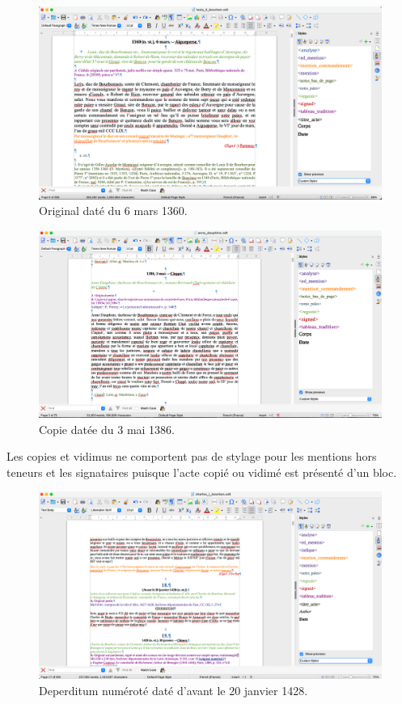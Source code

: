\begin{figure}[H]
    \centering
    \includegraphics[scale=0.3]{img/original.png}
    \caption{Original daté du 6 mars 1360.}
    \label{fig:original}
\end{figure}

\begin{figure}[H]
    \centering
    \includegraphics[scale=0.3]{img/copie.png}
    \caption{Copie datée du 3 mai 1386.}
    \label{fig:copie}
\end{figure}

\par Les copies et vidimus ne comportent pas de stylage pour les mentions hors teneurs et les signataires puisque l'acte copié ou vidimé est présenté d'un bloc. 

\begin{figure}[H]
    \centering
    \includegraphics[scale=0.3]{img/deperditum_numerote.png}
    \caption{Deperditum numéroté daté d'avant le 20 janvier 1428.}
    \label{fig:dep_num}
\end{figure}

